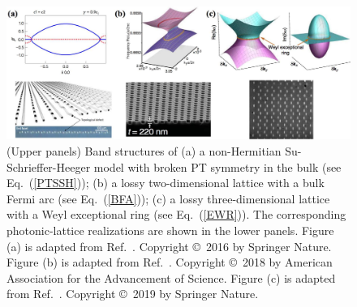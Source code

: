 \documentclass{tADP2e}
\theoremstyle{plain}
\theoremstyle{plain}
\theoremstyle{definition}
\begin{document}
\begin{figure}
\begin{center}
\includegraphics[width=14.5cm]{./Figures/fig_3_band.pdf}
\end{center}
\caption{(Upper panels) Band structures of (a) a non-Hermitian Su-Schrieffer-Heeger model with broken PT symmetry in the bulk (see Eq.~(\ref{PTSSH})); (b) a lossy two-dimensional lattice with a bulk Fermi arc (see Eq.~(\ref{BFA})); (c) a lossy three-dimensional lattice with a Weyl exceptional ring (see Eq.~(\ref{EWR})). The corresponding photonic-lattice realizations are shown in the lower panels. Figure (a) is adapted from Ref.~\cite{WS17}. Copyright \copyright\,   2016 by Springer Nature. Figure (b) is adapted from Ref.~\cite{ZH18}. Copyright \copyright\,   2018 by American Association for the
Advancement of Science.  Figure (c) is adapted from Ref.~\cite{AC19}. Copyright \copyright\,   2019 by Springer Nature.}
\label{fig:3band}
\end{figure}
\end{document}
